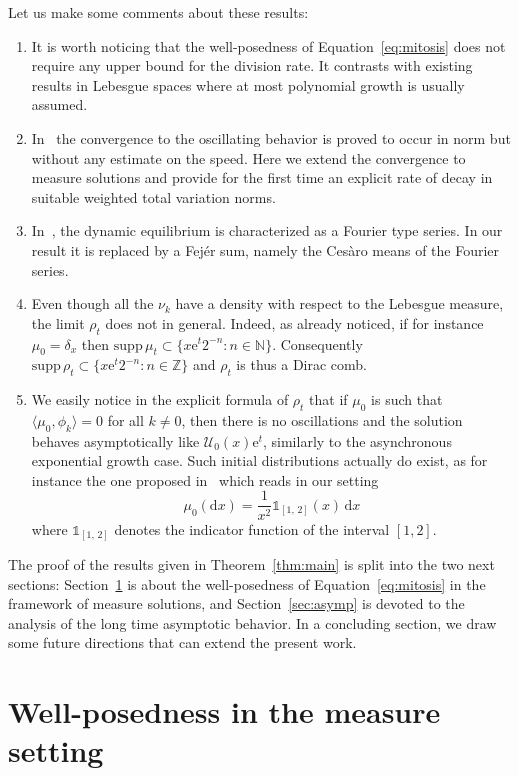 \documentclass[10pt]{amsart}
\theoremstyle{definition}\newtheorem{defi}[theo]{Definition}\newtheorem{rema}[theo]{Remark}\newtheorem{exam}[theo]{Example}\newtheorem{exem}[theo]{Example}\newtheorem{nota}[theo]{Notation}
\newcommand{\Ucal}{\mathcal{U}}
\newcommand{\Z}{\mathbb{Z}}
\newcommand{\N}{\mathbb{N}}
\newcommand{\1}{\mathds{1}}
\newcommand{\e}{\mathrm{e}}
\renewcommand{\d}{\mathrm{d}}
\newcommand{\supp}{\mathrm{supp\,}}
\newcommand*{\romanenumi}{\renewcommand*{\theenumi}{\roman{enumi}}}
\begin{document}
Let us make some comments about these results:
\begin{enumerate}\romanenumi
\item It is worth noticing that the well-posedness of Equation~\eqref{eq:mitosis} does not require any upper bound for the division rate. It contrasts with existing results in Lebesgue spaces where at most polynomial growth is usually assumed.
\item In~\cite{vanBrunt2018,BDG,GreinerNagel} the convergence to the oscillating behavior is proved to occur in norm but without any estimate on the speed. Here we extend the convergence to measure solutions and provide for the first time an explicit rate of decay in suitable weighted total variation norms.
\item In~\cite{BDG}, the dynamic equilibrium is characterized as a Fourier type series. In our result it is replaced by a Fejér sum, namely the Cesàro means of the Fourier series.
\item Even though all the $\nu_k$ have a density with respect to the Lebesgue measure, the limit $\rho_t$ does not in general. Indeed, as already noticed, if for instance $\mu_0=\delta_x$ then $\supp\mu_t\subset\{x\e^t2^{-n}: n\in\N\}$. Consequently $\supp\rho_t\subset\{x\e^t2^{-n}: n\in\Z\}$ and $\rho_t$ is thus a Dirac comb.
\item We easily notice in the explicit formula of $\rho_t$ that if $\mu_0$ is such that $\langle\mu_0,\phi_k\rangle=0$ for all $k\neq0$, then there is no oscillations and the solution behaves asymptotically like $\Ucal_0(x)\e^t$, similarly to the asynchronous exponential growth case. Such initial distributions actually do exist, as for instance the one proposed in~\cite{vanBrunt2018} which reads in our setting
\[
\mu_0(\d x)=\frac{1}{x^2}\1_{[1,\,2]}(x)\,\d x
\]
where $\1_{[1,\,2]}$ denotes the indicator function of the interval $[1,2].$
\end{enumerate}




The proof of the results given in Theorem~\ref{thm:main} is split into the two next sections: Section~\ref{sec:wellposedness} is about the well-posedness of Equation~\eqref{eq:mitosis} in the framework of measure solutions, and Section~\ref{sec:asymp} is devoted to the analysis of the long time asymptotic behavior. In a concluding section, we draw some future directions that can extend the present work.


\section{Well-posedness in the measure setting} \label{sec:wellposedness}
\end{document}
